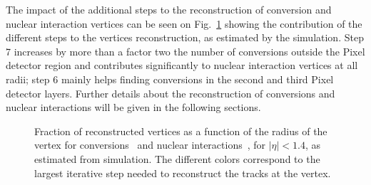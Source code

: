 The impact of the additional steps to the reconstruction of conversion
and nuclear interaction vertices can be seen on Fig.~\ref{fig:matItTk}
showing the contribution of the different steps to the vertices
reconstruction, as estimated by the simulation.
Step 7 increases by more than a factor two the number of conversions
outside the Pixel detector region and contributes significantly to nuclear
interaction vertices at all radii; step 6 mainly helps finding
conversions in the second and third Pixel detector layers. Further details
about the reconstruction of conversions and nuclear interactions will
be given in the following sections.
\begin{figure}[!hbtp]
\centering
{}
\caption{Fraction of reconstructed vertices as a function of the radius of the vertex
for conversions~ and nuclear
interactions~, for  $|\eta|<1.4$, as estimated
from simulation. The different colors correspond to the largest
iterative step needed to reconstruct the tracks at the vertex.}
\label{fig:matItTk}
\end{figure}
